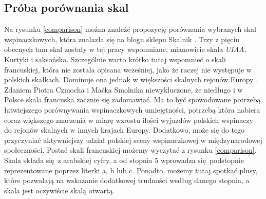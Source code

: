 \documentclass{article}
\begin{document}
\subsection{Próba porównania skal}
\label{porownanie}
Na rysunku \ref{comparison} można znaleźć propozycję porównania wybranych skal wspinaczkowych, która znalazła się na blogu sklepu Skalnik \cite{skalnik-skale}. Trzy z pięciu obecnych tam skal zostały w tej pracy wspomniane, mianowicie skala \textit{UIAA}, Kurtyki i saksońska. Szczególnie warto krótko tutaj wspomnieć o skali francuskiej, która nie została opisana wcześniej, jako że raczej nie występuje w polskich skałkach. Dominuje ona jednak w większości skalnych rejonów Europy \cite{8a-skale}. Zdaniem Piotra Czmocha \cite{8a-skale} i Maćka Smolnika \cite{weld-skale} niewykluczone, że niedługo i w Polsce skala francuska zacznie się zadomawiać. Ma to być spowodowane potrzebą łatwiejszego porównywania wspinaczkowych umiejętności, potrzebą która nabiera coraz większego znaczenia w miarę wzrostu ilości wyjazdów polskich wspinaczy do rejonów skalnych w innych krajach Europy. Dodatkowo, może się do tego przyczyniać aktywniejszy udział polskiej sceny wspinaczkowej w międzynarodowej społeczności. Postać skali francuskiej możemy wyczytać z rysunku \ref{comparison}. Skala składa się z arabskiej cyfry, a od stopnia 5 wprowadza się podstopnie reprezentowane poprzez literki a, b lub c. Ponadto, możemy tutaj spotkać plusy, które pozwalają na wskazanie dodatkowej trudności według danego stopnia, a skala jest oczywiście skalą otwartą.
\end{document}
